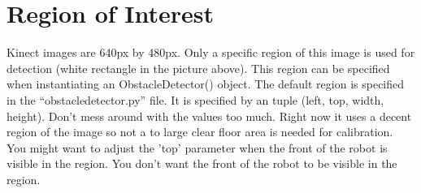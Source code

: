 \documentclass[a4paper, 12pt, oneside]{report}
\begin{document}
\section{Region of Interest}

Kinect images are 640px by 480px. 
Only a specific region of this image is used for detection (white rectangle in the picture above). 
This region can be specified when instantiating an ObstacleDetector() object. 
The default region is specified in the ``obstacledetector.py'' file. 
It is specified by an tuple (left, top, width, height). 
Don't mess around with the values too much. 
Right now it uses a decent region of the image so not a to large clear floor area is needed for calibration. 
You might want to adjust the 'top' parameter when the front of the robot is visible in the region. 
You don't want the front of the robot to be visible in the region.
\end{document}
